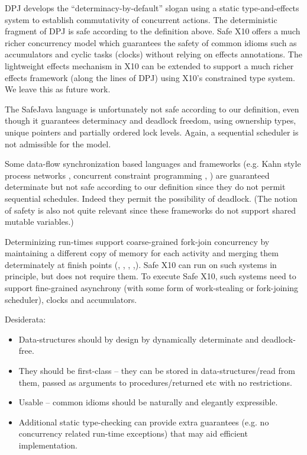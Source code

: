 DPJ develops the ``determinacy-by-default'' slogan using a static
type-and-effects system to establish commutativity of concurrent
actions.  The deterministic fragment of DPJ is safe according to the
definition above. Safe X10 offers a much richer concurrency model
which guarantees the safety of common idioms such as accumulators and
cyclic tasks (clocks) without relying on effects annotations. The
lightweight effects mechanism in X10 can be extended to support a much
richer effects framework (along the lines of DPJ) using X10's
constrained type system.  We leave this as future work.

The SafeJava language \cite{SafeJava} is unfortunately not safe
according to our definition, even though it guarantees determinacy and
deadlock freedom, using ownership types, unique pointers and partially
ordered lock levels. Again, a sequential scheduler is not admissible
for the model.

Some data-flow synchronization based languages and frameworks (e.g.{}
Kahn style process networks \cite{kahn,kahn-mcqueen}, concurrent
constraint programming \cite{ccp}, \cite{SHIM}) are guaranteed
determinate but not safe according to our definition since they do not
permit sequential schedules. Indeed they permit the possibility of
deadlock. (The notion of safety is also not quite relevant since these
frameworks do not support shared mutable variables.)

Determinizing run-times support coarse-grained fork-join concurrency
by maintaining a different copy of memory for each activity and
merging them determinately at finish points (\cite{grace},
\cite{core-det}, \cite{dmp}, \cite{kendo},\cite{determinator}). Safe
X10 can run on such systems in principle, but does not require them.
To execute Safe X10, such systems need to support fine-grained
asynchrony (with some form of work-stealing or fork-joining
scheduler), clocks and accumulators.





Desiderata:

\begin{itemize}
\item Data-structures should by design by dynamically determinate and
   deadlock-free.
\item They should be first-class -- they can be stored in
  data-structures/read from them, passed as arguments to
  procedures/returned etc with no restrictions. 
\item Usable -- common idioms should be naturally and elegantly expressible.
\item Additional static type-checking can provide extra guarantees
  (e.g.{} no concurrency related run-time exceptions) that may aid
  efficient implementation.
\end{itemize}

